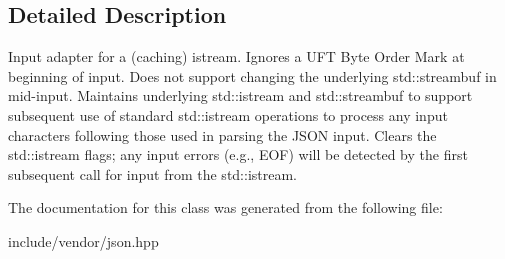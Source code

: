 \subsection{Detailed Description}
Input adapter for a (caching) istream. Ignores a U\+FT Byte Order Mark at beginning of input. Does not support changing the underlying std\+::streambuf in mid-\/input. Maintains underlying std\+::istream and std\+::streambuf to support subsequent use of standard std\+::istream operations to process any input characters following those used in parsing the J\+S\+ON input. Clears the std\+::istream flags; any input errors (e.\+g., E\+OF) will be detected by the first subsequent call for input from the std\+::istream. 

The documentation for this class was generated from the following file\+:\begin{DoxyCompactItemize}
\item 
include/vendor/json.\+hpp\end{DoxyCompactItemize}
